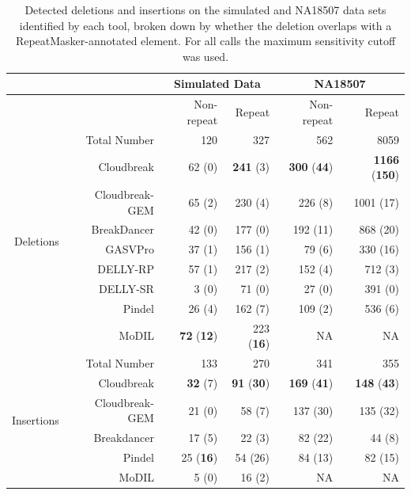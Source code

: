 \begin{table}
\begin{center}
\begin{tabular}{r|r|rr|rr}
  \cline{2-6}
 & & \multicolumn{2}{c}{Simulated Data} & \multicolumn{2}{c}{NA18507} \\
\hline
 & & Non-repeat & Repeat  & Non-repeat & Repeat \\ 
\multirow{9}{*}{\begin{sideways}Deletions\end{sideways}} & Total Number & 120 & 327 & 562 & 8059 \\ 
  \cline{2-6}
&  Cloudbreak  & 62 (0) & \textbf{241} (3) & \textbf{300} (\textbf{44}) & \textbf{1166} (\textbf{150}) \\ 
&  Cloudbreak-GEM  & 65 (2) & 230 (4) & 226 (8) & 1001 (17) \\ 
&  BreakDancer & 42 (0) & 177 (0) & 192 (11) & 868 (20) \\
&  GASVPro     & 37 (1) & 156 (1) & 79 (6) & 330 (16) \\
&  DELLY-RP       & 57 (1) & 217 (2) & 152 (4) & 712 (3) \\
&  DELLY-SR       & 3 (0) & 71 (0) & 27 (0) & 391 (0) \\
&  Pindel      & 26 (4) & 162 (7) & 109 (2) & 536 (6) \\ 
&  MoDIL      & \textbf{72} (\textbf{12}) & 223 (\textbf{16}) & NA & NA \\ 
   \hline
\multirow{6}{*}{\begin{sideways}Insertions\end{sideways}} & Total Number & 133 & 270 & 341 & 355 \\ 
\cline{2-6}
&  Cloudbreak  & \textbf{32} (7) & \textbf{91} (\textbf{30}) & \textbf{169} (\textbf{41}) & \textbf{148} (\textbf{43}) \\ 
&  Cloudbreak-GEM  & 21 (0) & 58 (7) & 137 (30) & 135 (32) \\ 
&  Breakdancer & 17 (5) & 22 (3) & 82 (22) & 44 (8) \\
&  Pindel      & 25 (\textbf{16}) & 54 (26) & 84 (13) & 82 (15) \\ 
&  MoDIL      & 5 (0) & 16 (2) & NA & NA \\ 
\hline
\end{tabular}
\end{center}
\caption{Detected deletions and insertions on the simulated and NA18507 data sets identified by each tool, broken down by whether the deletion overlaps with a RepeatMasker-annotated element. For all calls the maximum sensitivity cutoff was used.}
\label{predsByRepmask}
\end{table}

